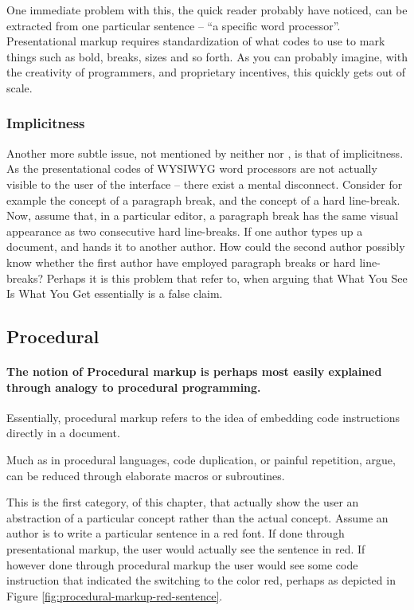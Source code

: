 \documentclass{scrreprt}
\begin{document}
One immediate problem with this, the quick reader probably have noticed, can be extracted from one particular sentence -- ``a specific word processor''. Presentational markup requires standardization of what codes to use to mark things such as bold, breaks, sizes and so forth. As you can probably imagine, with the creativity of programmers, and proprietary incentives, this quickly gets out of scale.

\subsubsection{Implicitness}
Another more subtle issue, not mentioned by neither \citet{coombs} nor \citet{bray}, is that of implicitness. As the presentational codes of WYSIWYG word processors are not actually visible to the user of the interface -- there exist a mental disconnect. Consider for example the concept of a paragraph break, and the concept of a hard line-break. Now, assume that, in a particular editor, a paragraph break has the same visual appearance as two consecutive hard line-breaks. If one author types up a document, and hands it to another author. How could the second author possibly know whether the first author have employed paragraph breaks or hard line-breaks? Perhaps it is this problem that \citet{bray} refer to, when arguing that What You See Is What You Get essentially is a false claim.



\subsection{Procedural}
\paragraph{The notion of Procedural markup is perhaps most easily explained through analogy to procedural programming.} Essentially, procedural markup refers to the idea of embedding code instructions directly in a document.

Much as in procedural languages, code duplication, or painful repetition, \citet{bray} argue, can be reduced through elaborate macros or subroutines.

This is the first category, of this chapter, that actually show the user an abstraction of a particular concept rather than the actual concept. Assume an author is to write a particular sentence in a red font. If done through presentational markup, the user would actually see the sentence in red. If however done through procedural markup the user would see some code instruction that indicated the switching to the color red, perhaps as depicted in Figure \ref{fig:procedural-markup-red-sentence}.
\end{document}
